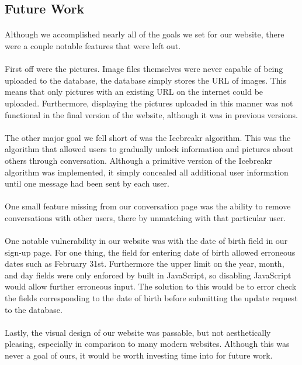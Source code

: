 \documentclass{article}
\begin{document}
    \subsection{Future Work}
    \paragraph{}
    Although we accomplished nearly all of the goals we set for our website, there were a couple notable features that were left out.
    \paragraph{}First off were the pictures. Image files themselves were never capable of being uploaded to the database, the database simply stores the URL of images. This means that only pictures with an existing URL on the internet could be uploaded. Furthermore, displaying the pictures uploaded in this manner was not functional in the final version of the website, although it was in previous versions.
    \paragraph{}
    The other major goal we fell short of was the Icebreakr algorithm. This was the algorithm that allowed users to gradually unlock information and pictures about others through conversation. Although a primitive version of the Icebreakr algorithm was implemented, it simply concealed all additional user information until one message had been sent by each user.
    \paragraph{}
    One small feature missing from our conversation page was the ability to remove conversations with other users, there by unmatching with that particular user.
    \paragraph{}
    One notable vulnerability in our website was with the date of birth field in our sign-up page. For one thing, the field for entering date of birth allowed erroneous dates such as February 31st. Furthermore the upper limit on the year, month, and day fields were only enforced by built in JavaScript, so disabling JavaScript would allow further erroneous input. The solution to this would be to error check the fields corresponding to the date of birth before submitting the update request to the database.
    \paragraph{}
    Lastly, the visual design of our website was passable, but not aesthetically pleasing, especially in comparison to many modern websites. Although this was never a goal of ours, it would be worth investing time into for future work.
\end{document}
